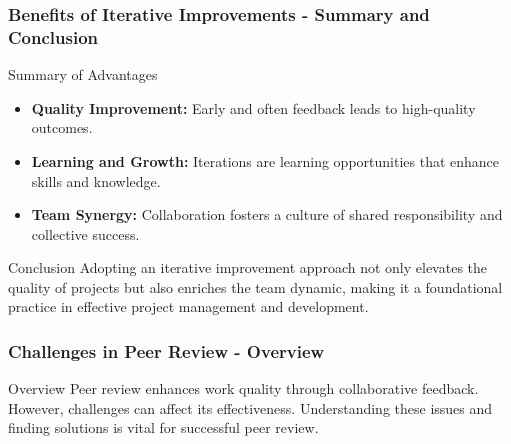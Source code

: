 \documentclass{beamer}
\begin{document}
\begin{frame}[fragile]
    \frametitle{Benefits of Iterative Improvements - Summary and Conclusion}
    \begin{block}{Summary of Advantages}
        \begin{itemize}
            \item \textbf{Quality Improvement:} Early and often feedback leads to high-quality outcomes.
            \item \textbf{Learning and Growth:} Iterations are learning opportunities that enhance skills and knowledge.
            \item \textbf{Team Synergy:} Collaboration fosters a culture of shared responsibility and collective success.
        \end{itemize}
    \end{block}

    \begin{block}{Conclusion}
        Adopting an iterative improvement approach not only elevates the quality of projects but also enriches the team dynamic, making it a foundational practice in effective project management and development.
    \end{block}
\end{frame}

\begin{frame}[fragile]
    \frametitle{Challenges in Peer Review - Overview}
    \begin{block}{Overview}
        Peer review enhances work quality through collaborative feedback. However, challenges can affect its effectiveness. Understanding these issues and finding solutions is vital for successful peer review.
    \end{block}
\end{frame}
\end{document}

